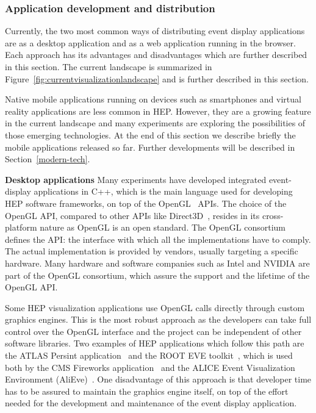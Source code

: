\documentclass[12pt,a4paper]{article}
\begin{document}

\hypertarget{application-development}{%
\subsubsection{Application development and distribution}\label{application-development}}

Currently, the two most common ways of distributing event display applications are as a desktop application and as a web
application running in the browser. Each approach has its advantages and disadvantages which are further described in this section.
The current landscape is summarized in Figure~\ref{fig:currentvisualizationlandscape} and is further described in this section.

Native mobile applications running on devices such as smartphones and virtual reality applications are less common in HEP.
However, they are a growing feature in the current landscape and many experiments are exploring the
possibilities of those emerging technologies. At the end of this section we describe briefly the mobile applications released so far.
Further developments will be described in
Section~\ref{modern-tech}.

{\bf Desktop applications} Many experiments have developed integrated event-display applications in C++, which is the main language
used for developing HEP software frameworks, on top of the OpenGL~\cite{OpenGL1992} APIs.
The choice of the OpenGL API, compared to other APIs like Direct3D~\cite{Direct3D}, resides in its cross-platform nature as
OpenGL is an open standard. The OpenGL consortium defines the API: the interface with which all the implementations have to
comply. The actual implementation is provided by vendors, usually targeting a specific hardware. Many hardware and
software companies such as Intel and NVIDIA are part of the OpenGL consortium, which assure
the support and the lifetime of the OpenGL API.

Some HEP visualization applications use OpenGL calls directly through custom graphics engines. This is the most
robust approach as the developers can take full control over the OpenGL interface
and the project can be independent of other software libraries. Two examples of HEP applications which follow this path are the
ATLAS Persint application~\cite{ATLASPersint2012} and the ROOT EVE toolkit~\cite{ROOTEVE2007}, which is used both by the CMS
Fireworks application~\cite{CMSFireworks} and the ALICE Event Visualization Environment (AliEve)~\cite{alieve}.
One disadvantage of this approach is that developer time has to be assured to maintain the graphics engine itself,
on top of the effort needed for the development and maintenance of the event display application.
\end{document}
